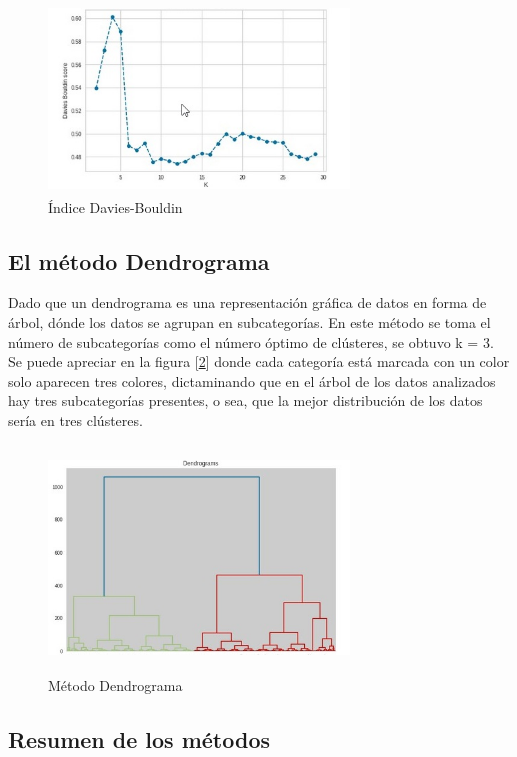 \begin{figure}[h!]
	\centering
	\includegraphics[width=8cm, height=5cm]{Images/DIndex.jpg} 
	\caption{Índice Davies-Bouldin}
	\label{fig:DI}
\end{figure}
\subsection{El método Dendrograma}
Dado que un dendrograma es una representación gráfica de datos en forma de árbol, dónde los datos se agrupan en subcategorías. En este método se toma el número de subcategorías como el número óptimo de clústeres, se obtuvo k = 3. Se puede apreciar en la figura [\ref*{fig:Dend}] donde cada categoría está marcada con un color solo aparecen tres colores, dictaminando que en el árbol de los datos analizados hay tres subcategorías presentes, o sea, que la mejor distribución de los datos sería en tres clústeres.

\begin{figure}[h!]
	\centering
	\includegraphics[width=8cm, height=6cm]{Images/Dendograma.jpg} 
	\caption{Método Dendrograma}
	\label{fig:Dend}
\end{figure}

\subsection{Resumen de los métodos}

